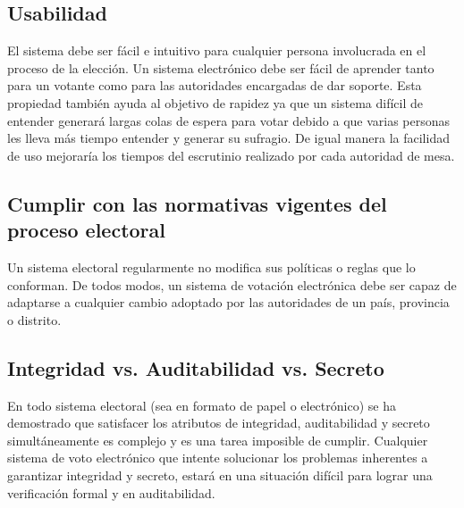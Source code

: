 \subsection{Usabilidad}

El sistema debe ser fácil e intuitivo para cualquier persona involucrada en el proceso de la elección. Un sistema electrónico debe ser fácil de aprender tanto para un votante como para las autoridades encargadas de dar soporte. Esta propiedad también ayuda al objetivo de rapidez ya que un sistema difícil de entender generará largas colas de espera para votar debido a que varias personas les lleva más tiempo entender y generar su sufragio. De igual manera la facilidad de uso mejoraría los tiempos del escrutinio realizado por cada autoridad de mesa.

\subsection{Cumplir con las normativas vigentes del proceso electoral}
Un sistema electoral regularmente no modifica sus políticas o reglas que lo conforman. De todos modos, un sistema de votación electrónica debe ser capaz de adaptarse a cualquier cambio adoptado por las autoridades de un país, provincia o distrito.

\subsection{Integridad vs. Auditabilidad vs. Secreto}
En todo sistema electoral (sea en formato de papel o electrónico) se ha demostrado que satisfacer los atributos de integridad, auditabilidad y secreto simultáneamente es complejo y es una tarea imposible de cumplir. Cualquier sistema de voto electrónico que intente solucionar los problemas inherentes a garantizar integridad y secreto, estará en una situación difícil para lograr una verificación formal y en auditabilidad. \cite{conicet}

